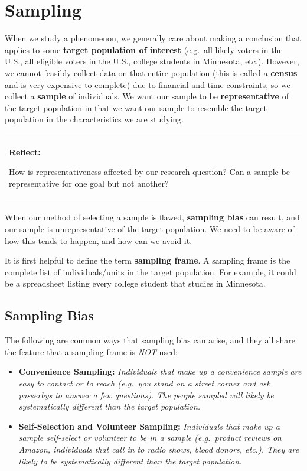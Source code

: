 \documentclass[]{book}
\newenvironment{reflect}
{
    \begin{center}
    
    \begin{tabular}{|p{0.8\textwidth}|}
    \rowcolor{LightBlue}
    \hline\\
    \rowcolor{LightBlue}
    \textbf{Reflect:}
}
{
    \\\rowcolor{LightBlue}
    \\\hline
    \end{tabular} 
    \end{center}
}
\begin{document}
\hypertarget{sampling}{%
\section{Sampling}\label{sampling}}

When we study a phenomenon, we generally care about making a conclusion that applies to some \textbf{target population of interest} (e.g.~all likely voters in the U.S., all eligible voters in the U.S., college students in Minnesota, etc.). However, we cannot feasibly collect data on that entire population (this is called a \textbf{census} and is very expensive to complete) due to financial and time constraints, so we collect a \textbf{sample} of individuals. We want our sample to be \textbf{representative} of the target population in that we want our sample to resemble the target population in the characteristics we are studying.

\begin{reflect}
How is representativeness affected by our research question? Can a
sample be representative for one goal but not another?
\end{reflect}

When our method of selecting a sample is flawed, \textbf{sampling bias} can result, and our sample is unrepresentative of the target population. We need to be aware of how this tends to happen, and how can we avoid it.

It is first helpful to define the term \textbf{sampling frame}. A sampling frame is the complete list of individuals/units in the target population. For example, it could be a spreadsheet listing every college student that studies in Minnesota.

\hypertarget{sampling-bias}{%
\subsection{Sampling Bias}\label{sampling-bias}}

The following are common ways that sampling bias can arise, and they all share the feature that a sampling frame is \emph{NOT} used:

\begin{itemize}
\item
  \textbf{Convenience Sampling:} \emph{Individuals that make up a convenience sample are easy to contact or to reach (e.g.~you stand on a street corner and ask passerbys to answer a few questions). The people sampled will likely be systematically different than the target population.}
\item
  \textbf{Self-Selection and Volunteer Sampling:} \emph{Individuals that make up a sample self-select or volunteer to be in a sample (e.g.~product reviews on Amazon, individuals that call in to radio shows, blood donors, etc.). They are likely to be systematically different than the target population.}
\end{itemize}
\end{document}
